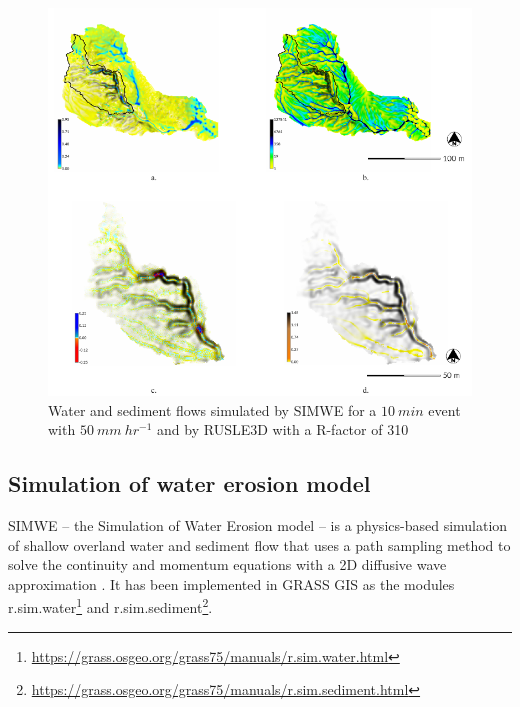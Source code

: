\documentclass[esurf, manuscript]{copernicus}
\begin{document}
\begin{figure}%
\center
\includegraphics[width=\textwidth,height=0.95\textheight,keepaspectratio]{figures/models.pdf}
\caption{Water and sediment flows simulated by SIMWE 
for a $10~min$ event with $50~mm~hr^{-1}$
and by RUSLE3D with a R-factor of 310
}
\label{fig:models}
\end{figure}

\subsection{Simulation of water erosion model} \label{simwe}
SIMWE -- the Simulation of Water Erosion model -- 
is a physics-based simulation of shallow overland water and sediment flow
that uses a path sampling method to solve the continuity and momentum equations 
with a 2D diffusive wave approximation 
\citep{Mitas1998,Mitasova2001,Mitasova2004}.
It has been implemented in GRASS GIS as the modules 
r.sim.water\footnote{\url{https://grass.osgeo.org/grass75/manuals/r.sim.water.html}} 
and r.sim.sediment\footnote{\url{https://grass.osgeo.org/grass75/manuals/r.sim.sediment.html}}.
\end{document}

